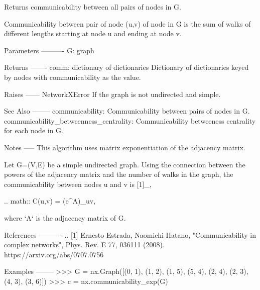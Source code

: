 \begin{DoxyVerb}Returns communicability between all pairs of nodes in G.

Communicability between pair of node (u,v) of node in G is the sum of
walks of different lengths starting at node u and ending at node v.

Parameters
----------
G: graph

Returns
-------
comm: dictionary of dictionaries
    Dictionary of dictionaries keyed by nodes with communicability
    as the value.

Raises
------
NetworkXError
    If the graph is not undirected and simple.

See Also
--------
communicability:
   Communicability between pairs of nodes in G.
communicability_betweenness_centrality:
   Communicability betweeness centrality for each node in G.

Notes
-----
This algorithm uses matrix exponentiation of the adjacency matrix.

Let G=(V,E) be a simple undirected graph.  Using the connection between
the powers  of the adjacency matrix and the number of walks in the graph,
the communicability between nodes u and v is [1]_,

.. math::
    C(u,v) = (e^A)_{uv},

where `A` is the adjacency matrix of G.

References
----------
.. [1] Ernesto Estrada, Naomichi Hatano,
   "Communicability in complex networks",
   Phys. Rev. E 77, 036111 (2008).
   https://arxiv.org/abs/0707.0756

Examples
--------
>>> G = nx.Graph([(0, 1), (1, 2), (1, 5), (5, 4), (2, 4), (2, 3), (4, 3), (3, 6)])
>>> c = nx.communicability_exp(G)
\end{DoxyVerb}
 